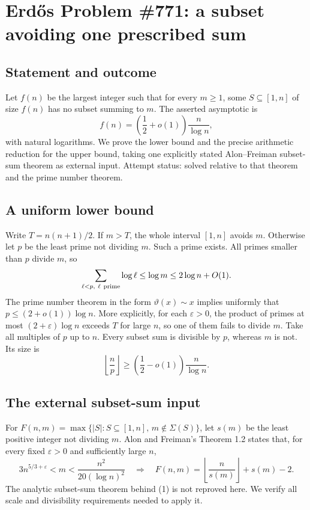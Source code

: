 \section*{Erd\H{o}s Problem \#771: a subset avoiding one prescribed sum}
\subsection*{Statement and outcome}
Let \(f(n)\) be the largest integer such that for every \(m\geq1\), some \(S\subseteq[1,n]\) of size \(f(n)\) has no subset summing to \(m\). The asserted asymptotic is
\[
f(n)=\left(\frac12+o(1)\right)\frac n{\log n},
\]
with natural logarithms. We prove the lower bound and the precise arithmetic reduction for the upper bound, taking one explicitly stated Alon--Freiman subset-sum theorem as external input. Attempt status: solved relative to that theorem and the prime number theorem.

\subsection*{A uniform lower bound}
Write \(T=n(n+1)/2\). If \(m>T\), the whole interval \([1,n]\) avoids \(m\). Otherwise let \(p\) be the least prime not dividing \(m\). Such a prime exists. All primes smaller than \(p\) divide \(m\), so
\[
\sum_{\ell<p,\ \ell\ {\rm prime}}\log\ell\leq\log m\leq2\log n+O(1).
\]
The prime number theorem in the form \(\vartheta(x)\sim x\) implies uniformly that
\(p\leq(2+o(1))\log n\). More explicitly, for each \(\varepsilon>0\), the product of primes at most \((2+\varepsilon)\log n\) exceeds \(T\) for large \(n\), so one of them fails to divide \(m\).
Take all multiples of \(p\) up to \(n\). Every subset sum is divisible by \(p\), whereas \(m\) is not. Its size is
\[
\left\lfloor\frac np\right\rfloor\geq
\left(\frac12-o(1)\right)\frac n{\log n}.
\]

\subsection*{The external subset-sum input}
For \(F(n,m)=\max\{|S|:S\subseteq[1,n],\,m\notin\Sigma(S)\}\), let \(s(m)\) be the least positive integer not dividing \(m\). Alon and Freiman's Theorem 1.2 states that, for every fixed \(\varepsilon>0\) and sufficiently large \(n\),
\[
3n^{5/3+\varepsilon}<m<\frac{n^2}{20(\log n)^2}
\quad\Longrightarrow\quad
F(n,m)=\left\lfloor\frac n{s(m)}\right\rfloor+s(m)-2. \tag{1}
\]
The analytic subset-sum theorem behind (1) is not reproved here. We verify all scale and divisibility requirements needed to apply it.


